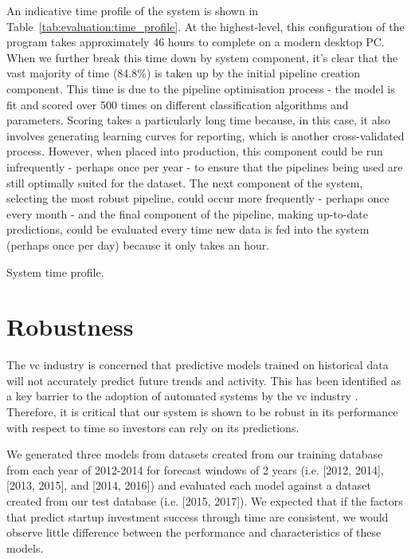 \documentclass[../thesis/thesis.tex]{subfiles}
\begin{document}
An indicative time profile of the system is shown in Table~\ref{tab:evaluation:time_profile}. At the highest-level, this configuration of the program takes approximately 46 hours to complete on a modern desktop PC. When we further break this time down by system component, it's clear that the vast majority of time (84.8\%) is taken up by the initial pipeline creation component. This time is due to the pipeline optimisation process - the model is fit and scored over 500 times on different classification algorithms and parameters. Scoring takes a particularly long time because, in this case, it also involves generating learning curves for reporting, which is another cross-validated process. However, when placed into production, this component could be run infrequently - perhaps once per year - to ensure that the pipelines being used are still optimally suited for the dataset. The next component of the system, selecting the most robust pipeline, could occur more frequently - perhaps once every month - and the final component of the pipeline, making up-to-date predictions, could be evaluated every time new data is fed into the system (perhaps once per day) because it only takes an hour.

\begin{table}[!htb]
    \centering
    \scalebox{0.9}{}
    \caption[System time profile]{System time profile.}
    \label{tab:evaluation:time_profile}
\end{table}

\section{Robustness}

The \gls{vc} industry is concerned that predictive models trained on historical data will not accurately predict future trends and activity. This  has been identified as a key barrier to the adoption of automated systems by the \gls{vc} industry \cite{stone2014}. Therefore, it is critical that our system is shown to be robust in its performance with respect to time so investors can rely on its predictions.

We generated three models from datasets created from our training database from each year of 2012-2014 for forecast windows of 2 years (i.e. [2012, 2014], [2013, 2015], and [2014, 2016]) and evaluated each model against a dataset created from our test database (i.e. [2015, 2017]). We expected that if the factors that predict startup investment success through time are consistent, we would observe little difference between the performance and characteristics of these models.
\end{document}
